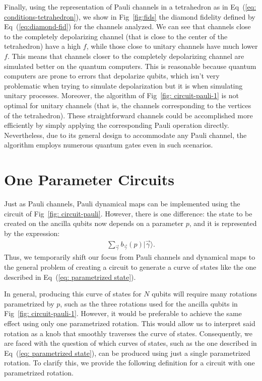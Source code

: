 \documentclass[10pt,letterpaper]{article} %
\newcommand{\fref}[1]{Fig~\ref{#1}}
\newcommand{\eref}[1]{Eq~(\ref{#1})}
\begin{document}
Finally, using the representation of Pauli channels in a tetrahedron as
in \eref{eq: conditions-tetrahedron},
we show in \fref{fig:fids} the diamond fidelity defined by \eref{eq:diamond-fid} for the channels
analyzed. 
We can see that channels close to the 
completely depolarizing
channel (that is close to the center of the tetrahedron)
have a high $f$, while those 
close to unitary channels have much lower $f$.
This means that channels closer to the 
completely depolarizing channel are simulated better on the quantum computers.
This is reasonable because quantum computers are prone to errors
that depolarize qubits, which isn't very problematic
when trying to simulate depolarization but it is 
when simulating unitary processes. Moreover, the algorithm of \fref{fig:
circuit-pauli-1} is not optimal for unitary channels (that is, the channels
corresponding to the vertices of the tetrahedron).  These straightforward
channels could be accomplished more efficiently by simply applying the
corresponding Pauli operation directly. Nevertheless, due to its general design
to accommodate any Pauli channel, the algorithm employs numerous quantum gates
even in such scenarios.







\section{One Parameter Circuits} %
\label{sec: 1PR Circuits}


Just as Pauli channels, Pauli dynamical maps can be implemented using the circuit
of \fref{fig: circuit-pauli}. However, there is one difference: 
the state to be created on the ancilla qubits now 
depends on a parameter $p$, and it is represented by the expression:
\begin{eqnarray}
\label{eq: parametrized state}
\sum_{\vec{\gamma}} b_{\vec{\gamma}}(p) |\vec{\gamma}\rangle.
\end{eqnarray}
Thus, we temporarily shift our focus from Pauli
channels and dynamical maps to the general problem of 
creating a circuit to generate a curve of
states like the one described in \eref{eq: parametrized state}.

In general, producing this curve of states for $N$ qubits will require
many rotations parametrized by $p$,
such as the three rotations used for the ancilla
qubits in \fref{fig: circuit-pauli-1}.
However, it would be preferable to achieve the same effect using only one parametrized rotation. 
This would allow us to interpret said rotation 
as a knob that smoothly traverses the curve of states.
Consequently, we are faced with the question of which curves of states, 
such as the one described in \eref{eq: parametrized state}, 
can be produced using just a single parametrized rotation. 
To clarify this, we provide the following definition 
for a circuit with one parametrized rotation.
\end{document}
